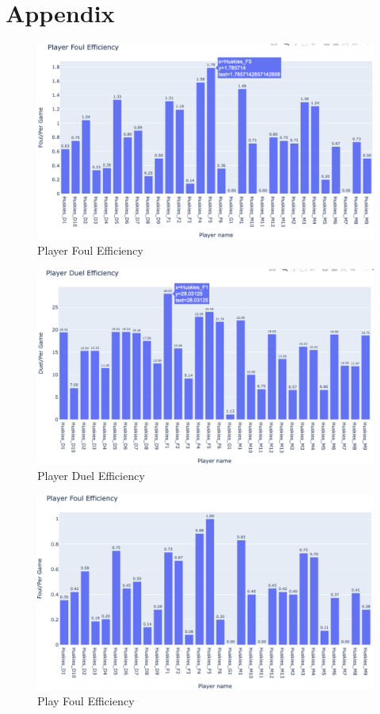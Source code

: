 \documentclass[12pt]{article}
\begin{document}
\section{Appendix}
\begin{figure}[ht]
\begin{center}
\includegraphics[scale=0.5]{images/a.png}
\caption{Player Foul Efficiency}
\end{center}
\end{figure}
\begin{figure}[ht]
\begin{center}
\includegraphics[scale=0.5]{images/b.png}
\caption{Player Duel Efficiency}
\end{center}
\end{figure}
\begin{figure}[ht]
\begin{center}
\includegraphics[scale=0.5]{images/c.png}
\caption{Play Foul Efficiency}
\end{center}
\end{figure}
\end{document}
